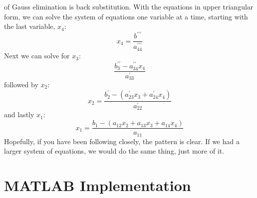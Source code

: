  of Gauss elimination is back substitution.  With the equations in upper triangular form, we can solve the system of equations one variable at a time, starting with the last variable, $x_4$:  
\begin{equation*}
x_{4} = \frac{b^{\prime \prime \prime}}{a^{\prime \prime \prime}_{44}}
\end{equation*}
Next we can solve for $x_3$:
\begin{equation*}
\frac{b^{\prime \prime}_3 - a^{\prime \prime}_{34}x_4}{a^{\prime}_{33}}
\end{equation*}
followed by $x_2$:
\begin{equation*}
x_{2} = \frac{b^{\prime}_2 - (a^{\prime}_{23}x_3 + a^{\prime}_{24}x_4) }{a^{\prime}_{22}}
\end{equation*}
and lastly $x_1$:
\begin{equation*}
x_1 = \frac{b_1 - (a_{12}x_2 + a_{13}x_3 + a_{14}x_4)}{a_{11}}
\end{equation*}
Hopefully, if you have been following closely, the pattern is clear. If we had a larger system of equations, we would do the same thing, just more of it.

\section{MATLAB Implementation}

